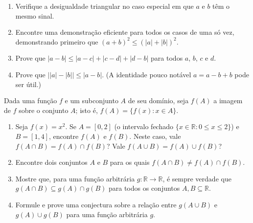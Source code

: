 \begin{exercise}\label{ex:valor-absoluto-propriedades}
\begin{enumerate}[label=\alph*)]
\item Verifique a desigualdade triangular no caso especial em que $a$ e $b$ têm o mesmo sinal.
\item Encontre uma demonstração eficiente para todos os casos de uma só vez, demonstrando primeiro que $(a + b)^{2} \leq (|a| + |b|)^{2}$.
\item Prove que $|a - b| \leq |a - c| + |c - d| + |d - b|$ para todos $a$, $b$, $c$ e $d$.
\item Prove que $\bigl||a| - |b|\bigr| \leq |a - b|$. (A identidade pouco notável $a = a - b + b$ pode ser útil.)
\end{enumerate}
\end{exercise}

\begin{exercise}\label{ex:imagem-de-conjuntos}
Dada uma função $f$ e um subconjunto $A$ de seu domínio, seja $f(A)$ a imagem de $f$ sobre o conjunto $A$; isto é, $f(A) = \{f(x) : x \in A\}$.
\begin{enumerate}[label=\alph*)]
\item Seja $f(x) = x^{2}$. Se $A = [0, 2]$ (o intervalo fechado $\{x \in \mathbb{R} : 0 \leq x \leq 2\}$) e $B = [1, 4]$, encontre $f(A)$ e $f(B)$. Neste caso, vale $f(A \cap B) = f(A) \cap f(B)$? Vale $f(A \cup B) = f(A) \cup f(B)$?  
\item Encontre dois conjuntos $A$ e $B$ para os quais $f(A \cap B) \neq f(A) \cap f(B)$.
\item Mostre que, para uma função arbitrária $g \colon \mathbb{R} \to \mathbb{R}$, é sempre verdade que $g(A \cap B) \subseteq g(A) \cap g(B)$ para todos os conjuntos $A, B \subseteq \mathbb{R}$.
\item Formule e prove uma conjectura sobre a relação entre $g(A \cup B)$ e $g(A) \cup g(B)$ para uma função arbitrária $g$.
\end{enumerate}
\end{exercise}

